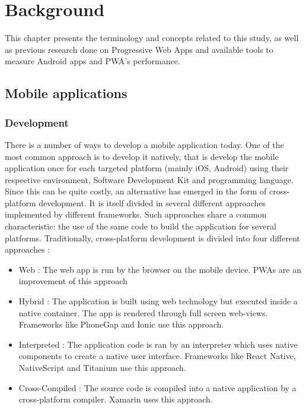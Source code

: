 \documentclass{kththesis}
\begin{document}
\chapter{Background}



This chapter presents the terminology and concepts related to this study, as well as previous research done on Progressive Web Apps and available tools to measure Android apps and PWA's performance.  

\section{Mobile applications}
\subsection{Development}
There is a number of ways to develop a mobile application today. One of the most common approach is to develop it natively, that is develop the mobile application once for each targeted platform (mainly iOS, Android) using their respective environment, Software Development Kit and programming language. Since this can be quite costly, an alternative has emerged in the form of cross-platform development. It is itself divided in several different approaches implemented by different frameworks. Such approaches share a common characteristic: the use of the same code to build the application for several platforms. 
Traditionally, cross-platform development is divided into four different approaches \cite{CrossPlatform_dev} :
\begin{itemize}
    \item Web : The web app is run by the browser on the mobile device. PWAs are an improvement of this approach
    \item Hybrid : The application is built using web technology but executed inside a native container. The app is rendered through full screen web-views. Frameworks like PhoneGap and Ionic \cite{crossplatform_approaches} use this approach.
    \item Interpreted : The application code is ran by an interpreter which uses native components to create a native user interface. Frameworks like React Native, NativeScript and Titanium \cite{emulating_native_w_crossplatform} use this approach.
    \item Cross-Compiled : The source code is compiled into a native application by a cross-platform compiler. Xamarin \cite{crossplatform_approaches} uses this approach. 
\end{itemize}
\end{document}
